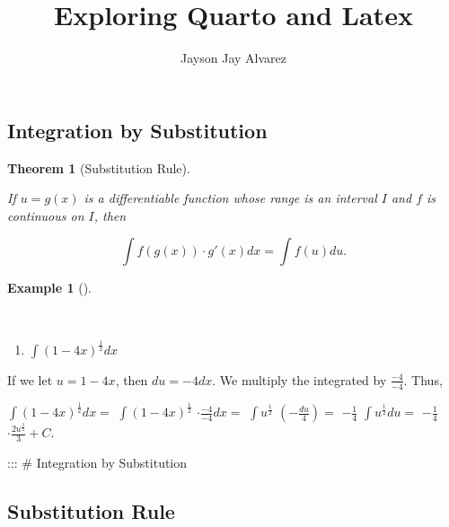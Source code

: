 \documentclass[
  letterpaper,
  DIV=11,
  numbers=noendperiod]{scrartcl}
\title{Exploring Quarto and Latex}
\author{Jayson Jay Alvarez}
\date{}
\providecommand{\tightlist}{%
  \setlength{\itemsep}{0pt}\setlength{\parskip}{0pt}}\usepackage{longtable,booktabs,array}
\theoremstyle{definition}
\newtheorem{example}{Example}[section]
\theoremstyle{plain}
\newtheorem{theorem}{Theorem}[section]
\theoremstyle{remark}
\begin{document}
\maketitle
\ifdefined\Shaded\renewenvironment{Shaded}{\begin{tcolorbox}[interior hidden, frame hidden, enhanced, breakable, sharp corners, boxrule=0pt, borderline west={3pt}{0pt}{shadecolor}]}{\end{tcolorbox}}\fi

\hypertarget{integration-by-substitution}{%
\subsection{Integration by
Substitution}\label{integration-by-substitution}}

\begin{theorem}[Substitution
Rule]\protect\hypertarget{thm-subrule}{}\label{thm-subrule}

If \(u = g(x)\) is a differentiable function whose range is an interval
\(I\) and \(f\) is continuous on \(I\), then

\[ \int f(g(x))\cdot g'(x)dx=\int f(u)du.\]

\end{theorem}

\begin{example}[]\protect\hypertarget{exm-sub_rule}{}\label{exm-sub_rule}

~

\begin{enumerate}
\def\labelenumi{\arabic{enumi}.}
\tightlist
\item
  \(\int(1-4x)^\frac{1}{2}dx\)
\end{enumerate}

If we let \(u = 1-4x\), then \(du= -4dx\). We multiply the integrated by
\(\frac{-4}{-4}\). Thus,

\(\int (1-4x)^\frac{1}{2}dx=\) \(\int(1-4x)^\frac{1}{2}\)
\(\cdot \frac{-4}{-4}dx=\) \(\int u^\frac{1}{2}\) \((-\frac{du}{4})=\)
\(-\frac{1}{4}\) \(\int u^\frac{1}{2} du=\) \(-\frac{1}{4}\)
\(\cdot \frac{2u^\frac{3}{2}}{3}+C.\)

\end{example}

::: \# Integration by Substitution

\hypertarget{htm:subrule}{}
\hypertarget{substitution-rule-1}{%
\subsection{Substitution Rule}\label{substitution-rule-1}}
\end{document}
